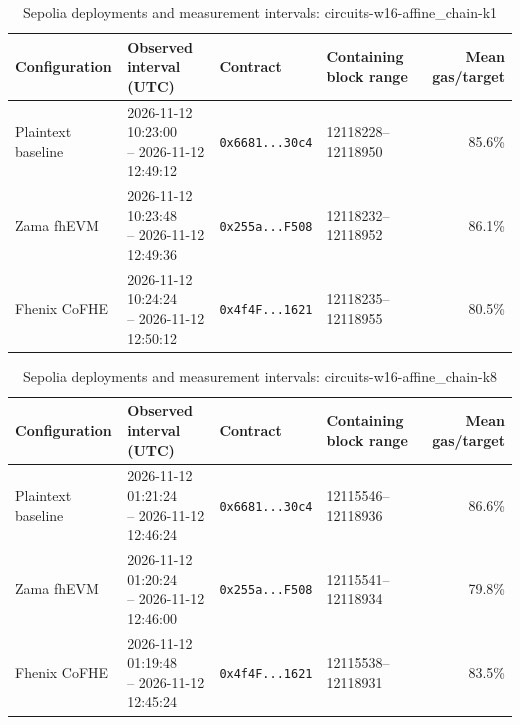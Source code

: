 \begin{table}[!t]
\caption{Sepolia deployments and measurement intervals: circuits-w16-affine\_chain-k1}
\label{tab:sepolia-circuits-w16-affine-chain-k1}
\centering
\footnotesize
\setlength{\tabcolsep}{4pt}
\begin{tabular}{|l|l|l|l|r|}
\hline
\textbf{Configuration} & \textbf{Observed interval (UTC)} & \textbf{Contract} & \textbf{Containing block range} & \textbf{Mean gas/target} \\
\hline
Plaintext baseline & \shortstack[l]{2026-11-12 10:23:00 \\ -- 2026-11-12 12:49:12} & \texttt{0x6681...30c4} & 12118228--12118950 & 85.6\% \\
\hline
Zama fhEVM & \shortstack[l]{2026-11-12 10:23:48 \\ -- 2026-11-12 12:49:36} & \texttt{0x255a...F508} & 12118232--12118952 & 86.1\% \\
\hline
Fhenix CoFHE & \shortstack[l]{2026-11-12 10:24:24 \\ -- 2026-11-12 12:50:12} & \texttt{0x4f4F...1621} & 12118235--12118955 & 80.5\% \\
\hline
\end{tabular}
\end{table}

\begin{table}[!t]
\caption{Sepolia deployments and measurement intervals: circuits-w16-affine\_chain-k8}
\label{tab:sepolia-circuits-w16-affine-chain-k8}
\centering
\footnotesize
\setlength{\tabcolsep}{4pt}
\begin{tabular}{|l|l|l|l|r|}
\hline
\textbf{Configuration} & \textbf{Observed interval (UTC)} & \textbf{Contract} & \textbf{Containing block range} & \textbf{Mean gas/target} \\
\hline
Plaintext baseline & \shortstack[l]{2026-11-12 01:21:24 \\ -- 2026-11-12 12:46:24} & \texttt{0x6681...30c4} & 12115546--12118936 & 86.6\% \\
\hline
Zama fhEVM & \shortstack[l]{2026-11-12 01:20:24 \\ -- 2026-11-12 12:46:00} & \texttt{0x255a...F508} & 12115541--12118934 & 79.8\% \\
\hline
Fhenix CoFHE & \shortstack[l]{2026-11-12 01:19:48 \\ -- 2026-11-12 12:45:24} & \texttt{0x4f4F...1621} & 12115538--12118931 & 83.5\% \\
\hline
\end{tabular}
\end{table}

